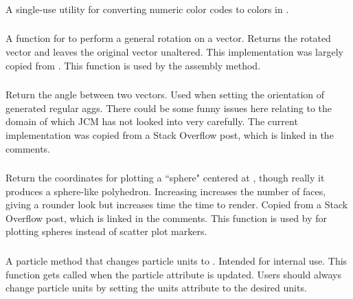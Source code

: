 \subsubsection{}
A single-use utility for converting \pkd{} numeric color codes to  colors in .

\subsubsection{}
A function for to perform a general rotation on a vector. Returns the rotated vector and leaves the original vector unaltered. This implementation was largely copied from . This function is used by the  assembly method.

\subsubsection{}
Return the angle between two vectors. Used when setting the orientation of generated regular aggs. There could be some funny issues here relating to the domain of  which JCM has not looked into very carefully. The current implementation was copied from a Stack Overflow post, which is linked in the  comments.

\subsubsection{}
Return the coordinates for plotting a ``sphere" centered at , though really it produces a sphere-like polyhedron. Increasing  increases the number of faces, giving a rounder look but increases time the time to render. Copied from a Stack Overflow post, which is linked in the  comments. This function is used by  for plotting spheres instead of scatter plot markers. 


\subsubsection{}
A particle method that changes particle units to . Intended for internal  use. This function gets called when the particle  attribute is updated. Users should always change particle units by setting the units attribute to the desired units.

